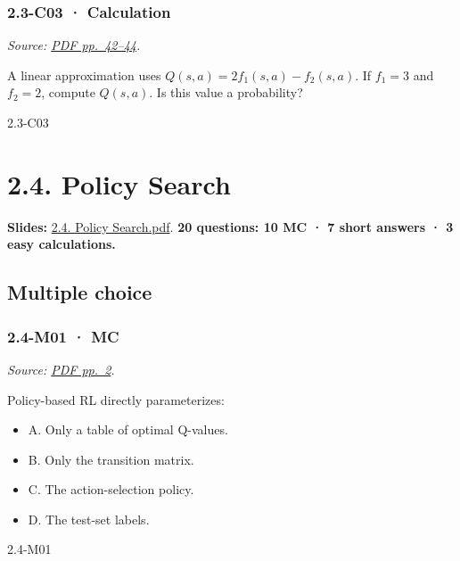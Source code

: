 \noindent\begin{minipage}{\linewidth}

\subsubsection{2.3-C03 · Calculation}\label{c03-calculation-5}

\emph{Source:
\href{../Lecture\%20Slides/2.3.\%20Q-learning.pdf\#page=42}{PDF
pp.~42--44}.}

A linear approximation uses \(Q(s,a)=2f_1(s,a)-f_2(s,a)\). If \(f_1=3\)
and \(f_2=2\), compute \(Q(s,a)\). Is this value a probability?

\begin{solution}[26mm]{2.3-C03}

\end{solution}
\end{minipage}\par\medskip

\clearpage

\section{2.4. Policy Search}\label{policy-search}

\textbf{Slides:}
\href{../Lecture\%20Slides/2.4.\%20Policy\%20Search.pdf}{2.4. Policy
Search.pdf}. \textbf{20 questions: 10 MC · 7 short answers · 3 easy
calculations.}

\subsection{Multiple choice}\label{multiple-choice-6}

\noindent\begin{minipage}{\linewidth}

\subsubsection{2.4-M01 · MC}\label{m01-mc-6}

\emph{Source:
\href{../Lecture\%20Slides/2.4.\%20Policy\%20Search.pdf\#page=2}{PDF
pp.~2}.}

Policy-based RL directly parameterizes:

\begin{itemize}
\tightlist
\item
  A. Only a table of optimal Q-values.
\item
  B. Only the transition matrix.
\item
  C. The action-selection policy.
\item
  D. The test-set labels.
\end{itemize}

\begin{solution}[8mm]{2.4-M01}

\end{solution}
\end{minipage}\par\medskip

